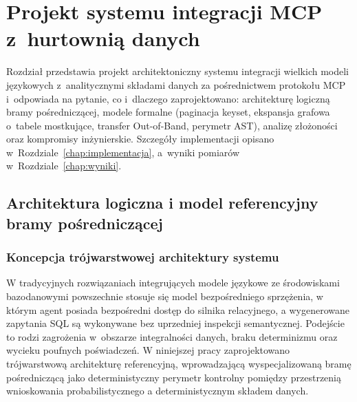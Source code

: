 \chapter{Projekt systemu integracji MCP z~hurtownią danych}
\label{chap:projekt}

Rozdział przedstawia projekt architektoniczny systemu integracji wielkich modeli językowych z~analitycznymi składami danych za pośrednictwem protokołu MCP~\cite{mcp_spec} i~odpowiada na pytanie, co i~dlaczego zaprojektowano: architekturę logiczną bramy pośredniczącej, modele formalne (paginacja keyset, ekspansja grafowa o~tabele mostkujące, transfer Out-of-Band, perymetr AST), analizę złożoności oraz kompromisy inżynierskie. Szczegóły implementacji opisano w~Rozdziale~\ref{chap:implementacja}, a~wyniki pomiarów w~Rozdziale~\ref{chap:wyniki}.


\section{Architektura logiczna i model referencyjny bramy pośredniczącej}
\label{sec:projekt_architektura}

\subsection{Koncepcja trójwarstwowej architektury systemu}
\label{subsec:projekt_trojwarstwowa}

W tradycyjnych rozwiązaniach integrujących modele językowe ze środowiskami bazodanowymi powszechnie stosuje się model bezpośredniego sprzężenia, w którym agent posiada bezpośredni dostęp do silnika relacyjnego, a wygenerowane zapytania SQL są wykonywane bez uprzedniej inspekcji semantycznej. Podejście to rodzi zagrożenia w~obszarze integralności danych, braku determinizmu oraz wycieku poufnych poświadczeń. W niniejszej pracy zaprojektowano trójwarstwową architekturę referencyjną, wprowadzającą wyspecjalizowaną bramę pośredniczącą jako deterministyczny perymetr kontrolny pomiędzy przestrzenią wnioskowania probabilistycznego a deterministycznym składem danych.

